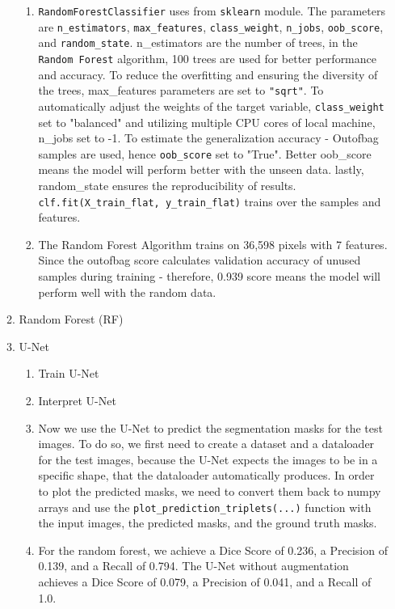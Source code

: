 \documentclass[
    a4paper,
    12pt,
    parskip=half,
]{scrarticle}
\begin{document}
\begin{enumerate}
\begin{enumerate}[label=\theenumi.\arabic*.]
\begin{enumerate}[label=\alph*)]
            \item \texttt{RandomForestClassifier} uses from \texttt{sklearn} module. The parameters are \texttt{n\_estimators}, \texttt{max\_features}, \texttt{class\_weight}, \texttt{n\_jobs}, \texttt{oob\_score}, and \texttt{random\_state}. n\_estimators are the number of trees, in the \texttt{Random Forest} algorithm, 100 trees are used for better performance and accuracy.
            To reduce the overfitting and ensuring the diversity of the trees, max\_features parameters are set to \texttt{"sqrt"}. To automatically adjust the weights of the target variable, \texttt{class\_weight} set to "balanced" and utilizing multiple CPU cores of local machine, n\_jobs set to -1. To estimate the generalization accuracy - Out\-of\-bag samples are used, hence \texttt{oob\_score} set to "True". Better oob\_score means the model will perform better with the unseen data. lastly, random\_state ensures the reproducibility of results. \texttt{clf.fit(X\_train\_flat, y\_train\_flat)} trains over the samples and features. 
            \item The Random Forest Algorithm trains on 36,598 pixels with 7 features. Since the out\-of\-bag score calculates validation accuracy of unused samples during training - therefore, 0.939 score means the model will perform well with the random data.
        \end{enumerate}
        \item Random Forest (RF)
        \item U-Net
        \begin{enumerate}[label=\alph*)]
            \item Train U-Net
            \item Interpret U-Net
            \item Now we use the U-Net to predict the segmentation masks for the test images.
            To do so, we first need to create a dataset and a dataloader for the test images, because the U-Net expects the images to be in a specific shape, that the dataloader automatically produces.
            In order to plot the predicted masks, we need to convert them back to numpy arrays and use the \texttt{plot\_prediction\_triplets(...)} function with the input images, the predicted masks, and the ground truth masks.
            \item For the random forest, we achieve a Dice Score of 0.236, a Precision of 0.139, and a Recall of 0.794.
            The U-Net without augmentation achieves a Dice Score of 0.079, a Precision of 0.041, and a Recall of 1.0.

\end{enumerate}
\end{enumerate}
\end{enumerate}
\end{document}
